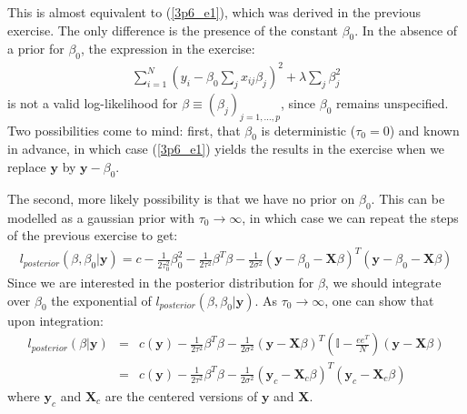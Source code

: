 


This is almost equivalent to (\ref{3p6_e1}), which was derived in the previous exercise.
The only difference is the presence of the constant $\beta_0$. In the absence of a prior for $\beta_0$,
the expression in the exercise:
\begin{eqnarray*}
    \sum_{i=1}^N \left( y_i -\beta_0 \sum_j x_{ij} \beta_j \right)^2 + \lambda \sum_j \beta_j^2
\end{eqnarray*}
is not a valid log-likelihood for $\beta \equiv (\beta_j)_{j=1,\ldots,p}$, since $\beta_0$ remains
unspecified. Two possibilities come to mind: first, that $\beta_0$ is deterministic ($\tau_0 = 0$) 
and known in advance, in which case (\ref{3p6_e1}) yields the results in the exercise
when we replace $\mathbf{y}$ by $\mathbf{y} - \beta_0$. 

The second, more likely possibility is that we have no prior on $\beta_0$. This can be modelled as
a gaussian prior with $\tau_0 \rightarrow \infty$, in which case we can repeat the steps of the 
previous exercise to get:
\begin{eqnarray*}
    l_{posterior}(\beta, \beta_0 | \mathbf{y}) = c - \frac{1}{2 \tau_0^2} \beta_0^2 - \frac{1}{2 \tau^2} \beta^T \beta - \frac{1}{2 \sigma^2} \left( \mathbf{y} - \beta_0 - \mathbf{X} \beta \right)^T \left( \mathbf{y}- \beta_0 - \mathbf{X} \beta \right)
\end{eqnarray*}
Since we are interested in the posterior distribution for $\beta$, we should integrate over $\beta_0$ the exponential of $l_{posterior}(\beta, \beta_0 | \mathbf{y})$. As $\tau_0 \rightarrow \infty$, one can
show that upon integration:
\begin{eqnarray*}
    l_{posterior}(\beta | \mathbf{y}) & = & c(\mathbf{y}) - \frac{1}{2 \tau^2} \beta^T \beta - \frac{1}{2 \sigma^2} \left( \mathbf{y} - \mathbf{X} \beta \right)^T \left( \mathbb{I} - \frac{e e^T}{N} \right)\left( \mathbf{y}  - \mathbf{X} \beta \right) \\
    & = & c(\mathbf{y}) - \frac{1}{2 \tau^2} \beta^T \beta - \frac{1}{2 \sigma^2} \left( \mathbf{y}_c - \mathbf{X}_c \beta \right)^T \left( \mathbf{y}_c  - \mathbf{X}_c \beta \right)
\end{eqnarray*}
where $\mathbf{y}_c$ and $\mathbf{X}_c$ are the centered versions of $\mathbf{y}$ and $\mathbf{X}$.